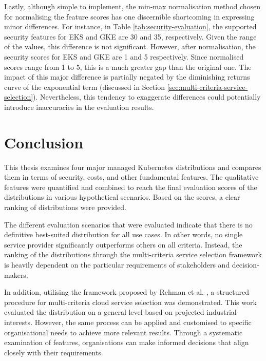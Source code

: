 Lastly, although simple to implement, the min-max normalisation method chosen for normalising the feature scores has one discernible shortcoming in expressing minor differences. For instance, in Table \ref{tab:security-evaluation}, the supported security features for EKS and GKE are 30 and 35, respectively. Given the range of the values, this difference is not significant. However, after normalisation, the security scores for EKS and GKE are 1 and 5 respectively. Since normalised scores range from 1 to 5, this is a much greater gap than the original one. The impact of this major difference is partially negated by the diminishing returns curve of the exponential term (discussed in Section \ref{sec:multi-criteria-service-selection}). Nevertheless, this tendency to exaggerate differences could potentially introduce inaccuracies in the evaluation results.


\chapter{Conclusion}\label{conclusion}

This thesis examines four major managed Kubernetes distributions and compares them in terms of security, costs, and other fundamental features. The qualitative features were quantified and combined to reach the final evaluation scores of the distributions in various hypothetical scenarios. Based on the scores, a clear ranking of distributions were provided.

The different evaluation scenarios that were evaluated indicate that there is no definitive best-suited distribution for all use cases. In other words, no single service provider significantly outperforms others on all criteria. Instead, the ranking of the distributions through the multi-criteria service selection framework is heavily dependent on the particular requirements of stakeholders and decision-makers.

In addition, utilising the framework proposed by Rehman et al. \cite{5976164}, a structured procedure for multi-criteria cloud service selection was demonstrated. This work evaluated the distribution on a general level based on projected industrial interests. However, the same process can be applied and customised to specific organisational needs to achieve more relevant results. Through a systematic examination of features, organisations can make informed decisions that align closely with their requirements.


